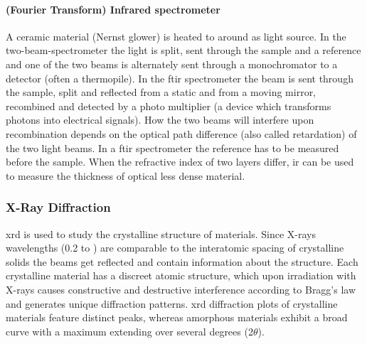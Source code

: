 \paragraph{(Fourier Transform) Infrared spectrometer}
 A ceramic material (Nernst glower) is heated to around  as light source. 
 In the two-beam-spectrometer the light is split, sent through the sample and a reference and one of the two beams is alternately sent through a monochromator to a detector (often a thermopile).
%
In the \gls{ft}\gls{ir} spectrometer the beam is sent through the sample, split and 
reflected from a static and from a moving mirror, recombined and detected by a photo 
multiplier (a device which transforms photons into electrical signals). 
How the two beams will interfere upon recombination depends on the optical path difference (also called retardation) of the two light beams\cite{Schwedt2008}.
In a \gls{ft}\gls{ir} spectrometer the reference has to be measured before the sample.
%
When the refractive index of two layers differ, \gls{ir} can be used to measure the thickness\cite{Dumin1967} of optical less dense material.




\subsubsection{X-Ray Diffraction}
\gls{xrd} is used to study the crystalline structure of materials.
Since X-rays wavelengths (\num{0.2} to ) are comparable to the interatomic spacing of crystalline solids the beams get reflected and contain information about the structure\cite{Kaliva2020}.
Each crystalline material has a discreet atomic structure, which upon irradiation with 
X-rays causes constructive and destructive interference according to Bragg's law and generates unique diffraction patterns. 
\Gls{xrd} diffraction plots of crystalline materials feature distinct peaks, whereas amorphous materials exhibit a broad curve with a maximum extending over several degrees (2$\theta$).


